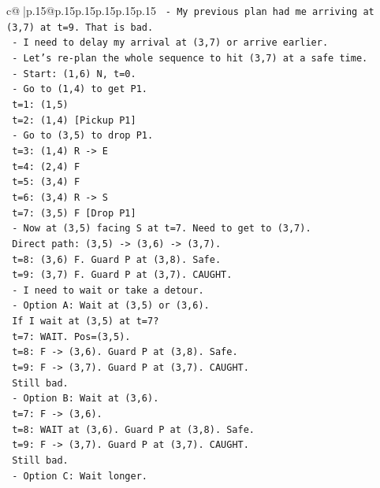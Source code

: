 \documentclass{article}
\begin{document}
{\begin{supertabular}{c@{$\;$}|p{.15\linewidth}@{}p{.15\linewidth}p{.15\linewidth}p{.15\linewidth}p{.15\linewidth}p{.15\linewidth}}
{{{\texttt{  {-} My previous plan had me arriving at (3,7) at t=9. That is bad.} \\
\texttt{  {-} I need to delay my arrival at (3,7) or arrive earlier.} \\
\texttt{  {-} Let's re{-}plan the whole sequence to hit (3,7) at a safe time.} \\
\texttt{  {-} Start: (1,6) N, t=0.} \\
\texttt{  {-} Go to (1,4) to get P1.} \\
\texttt{    t=1: (1,5)} \\
\texttt{    t=2: (1,4) {[}Pickup P1{]}} \\
\texttt{  {-} Go to (3,5) to drop P1.} \\
\texttt{    t=3: (1,4) R {-}> E} \\
\texttt{    t=4: (2,4) F} \\
\texttt{    t=5: (3,4) F} \\
\texttt{    t=6: (3,4) R {-}> S} \\
\texttt{    t=7: (3,5) F {[}Drop P1{]}} \\
\texttt{  {-} Now at (3,5) facing S at t=7. Need to get to (3,7).} \\
\texttt{    Direct path: (3,5) {-}> (3,6) {-}> (3,7).} \\
\texttt{    t=8: (3,6) F. Guard P at (3,8). Safe.} \\
\texttt{    t=9: (3,7) F. Guard P at (3,7). CAUGHT.} \\
\texttt{  {-} I need to wait or take a detour.} \\
\texttt{  {-} Option A: Wait at (3,5) or (3,6).} \\
\texttt{    If I wait at (3,5) at t=7?} \\
\texttt{    t=7: WAIT. Pos=(3,5).} \\
\texttt{    t=8: F {-}> (3,6). Guard P at (3,8). Safe.} \\
\texttt{    t=9: F {-}> (3,7). Guard P at (3,7). CAUGHT.} \\
\texttt{    Still bad.} \\
\texttt{  {-} Option B: Wait at (3,6).} \\
\texttt{    t=7: F {-}> (3,6).} \\
\texttt{    t=8: WAIT at (3,6). Guard P at (3,8). Safe.} \\
\texttt{    t=9: F {-}> (3,7). Guard P at (3,7). CAUGHT.} \\
\texttt{    Still bad.} \\
\texttt{  {-} Option C: Wait longer.} \\
}}}
\end{supertabular}}
\end{document}
